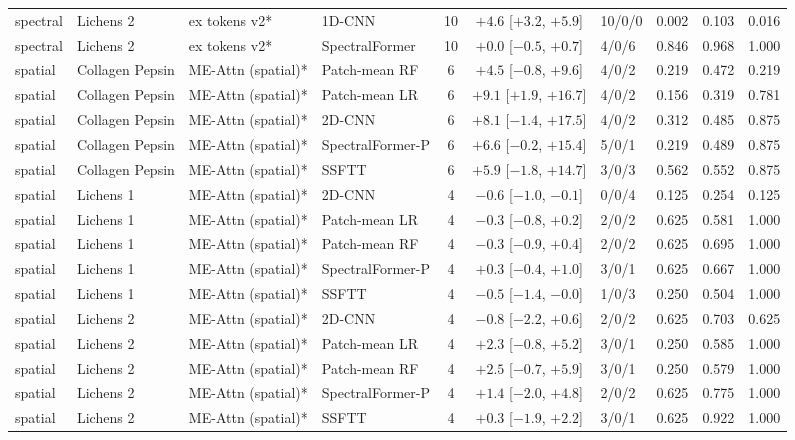 \begin{tabular}{llllcclccc}
spectral & Lichens 2 & ex tokens v2* & 1D-CNN & 10 & $+4.6$ [$+3.2$, $+5.9$] & 10/0/0 & 0.002 & 0.103 & 0.016 \\
spectral & Lichens 2 & ex tokens v2* & SpectralFormer & 10 & $+0.0$ [$-0.5$, $+0.7$] & 4/0/6 & 0.846 & 0.968 & 1.000 \\
\midrule
spatial & Collagen Pepsin & ME-Attn (spatial)* & Patch-mean RF & 6 & $+4.5$ [$-0.8$, $+9.6$] & 4/0/2 & 0.219 & 0.472 & 0.219 \\
spatial & Collagen Pepsin & ME-Attn (spatial)* & Patch-mean LR & 6 & $+9.1$ [$+1.9$, $+16.7$] & 4/0/2 & 0.156 & 0.319 & 0.781 \\
spatial & Collagen Pepsin & ME-Attn (spatial)* & 2D-CNN & 6 & $+8.1$ [$-1.4$, $+17.5$] & 4/0/2 & 0.312 & 0.485 & 0.875 \\
spatial & Collagen Pepsin & ME-Attn (spatial)* & SpectralFormer-P & 6 & $+6.6$ [$-0.2$, $+15.4$] & 5/0/1 & 0.219 & 0.489 & 0.875 \\
spatial & Collagen Pepsin & ME-Attn (spatial)* & SSFTT & 6 & $+5.9$ [$-1.8$, $+14.7$] & 3/0/3 & 0.562 & 0.552 & 0.875 \\
\midrule
spatial & Lichens 1 & ME-Attn (spatial)* & 2D-CNN & 4 & $-0.6$ [$-1.0$, $-0.1$] & 0/0/4 & 0.125 & 0.254 & 0.125 \\
spatial & Lichens 1 & ME-Attn (spatial)* & Patch-mean LR & 4 & $-0.3$ [$-0.8$, $+0.2$] & 2/0/2 & 0.625 & 0.581 & 1.000 \\
spatial & Lichens 1 & ME-Attn (spatial)* & Patch-mean RF & 4 & $-0.3$ [$-0.9$, $+0.4$] & 2/0/2 & 0.625 & 0.695 & 1.000 \\
spatial & Lichens 1 & ME-Attn (spatial)* & SpectralFormer-P & 4 & $+0.3$ [$-0.4$, $+1.0$] & 3/0/1 & 0.625 & 0.667 & 1.000 \\
spatial & Lichens 1 & ME-Attn (spatial)* & SSFTT & 4 & $-0.5$ [$-1.4$, $-0.0$] & 1/0/3 & 0.250 & 0.504 & 1.000 \\
\midrule
spatial & Lichens 2 & ME-Attn (spatial)* & 2D-CNN & 4 & $-0.8$ [$-2.2$, $+0.6$] & 2/0/2 & 0.625 & 0.703 & 0.625 \\
spatial & Lichens 2 & ME-Attn (spatial)* & Patch-mean LR & 4 & $+2.3$ [$-0.8$, $+5.2$] & 3/0/1 & 0.250 & 0.585 & 1.000 \\
spatial & Lichens 2 & ME-Attn (spatial)* & Patch-mean RF & 4 & $+2.5$ [$-0.7$, $+5.9$] & 3/0/1 & 0.250 & 0.579 & 1.000 \\
spatial & Lichens 2 & ME-Attn (spatial)* & SpectralFormer-P & 4 & $+1.4$ [$-2.0$, $+4.8$] & 2/0/2 & 0.625 & 0.775 & 1.000 \\
spatial & Lichens 2 & ME-Attn (spatial)* & SSFTT & 4 & $+0.3$ [$-1.9$, $+2.2$] & 3/0/1 & 0.625 & 0.922 & 1.000 \\
\bottomrule
\end{tabular}
